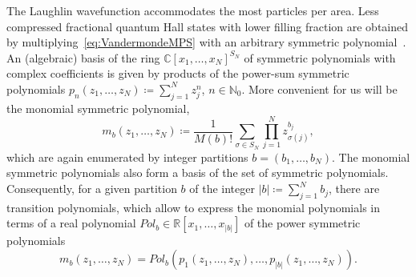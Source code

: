 \documentclass[letterpaper, DIV=17]{scrartcl}
\numberwithin{equation}{section}
\theoremstyle{definition}
\newcommand{\pol}{Pol}
\begin{document}
The Laughlin wavefunction accommodates the most particles per area. Less compressed fractional quantum Hall states with lower filling fraction are obtained by multiplying~\eqref{eq:VandermondeMPS} with an arbitrary symmetric polynomial~\cite{Simon21}. 
An (algebraic) basis of the ring $ \mathbb{C}[x_1, \dots, x_{N}]^{S_N} $ of symmetric polynomials with complex coefficients is given by products of the  power-sum symmetric polynomials 
$
			p_n(z_1, \dots, z_N) \coloneqq \sum_{j=1}^N z_j^n $, $n \in \mathbb{N}_0 $.
More convenient for us will be the monomial symmetric polynomial, 
		\begin{equation} \label{def monomial symmetric polynomial}
			m_{b}(z_1, \dots, z_N) \coloneqq  \frac{1}{ M(b)!} \sum_{\sigma\in S_N} \prod_{j=1}^N z_{\sigma(j)}^{b_j} ,
		\end{equation}
		which are again enumerated by integer partitions $b =(b_1,\dots, b_N) $. 
		The monomial symmetric polynomials also form a basis of the set of symmetric polynomials. Consequently, for a given partition $ b $ of the integer $ | b | \coloneqq \sum_{j=1}^N b_j $, there are transition polynomials, which allow to express the monomial polynomials in terms of a real polynomial $ \pol_b \in \mathbb{R}[x_1, \dots, x_{\vert b\vert}] $ of the power symmetric polynomials  \cite[Prop. 7.7.1]{stanley2001enumerative}
		\begin{equation} \label{def Fb}
				m_b(z_1, \dots, z_N) = \pol_b(p_1(z_1, \dots, z_N), \dots,   p_{\vert b \vert}(z_1, \dots, z_N)).
			\end{equation} 
		
\end{document}
